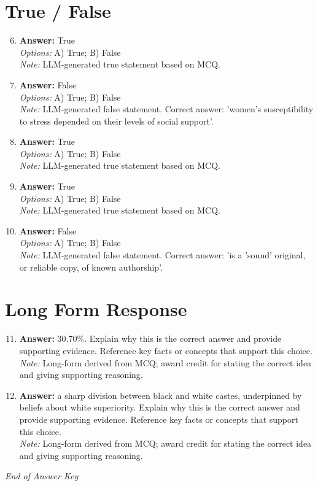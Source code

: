 \documentclass[12pt]{article}
\begin{document}
\section*{True / False}
\begin{enumerate}[label=\arabic*.]
\setcounter{enumi}{5}
\item \textbf{Answer:} True
\\ \textit{Options:} A) True; B) False
\\ \textit{Note:} LLM-generated true statement based on MCQ.
\item \textbf{Answer:} False
\\ \textit{Options:} A) True; B) False
\\ \textit{Note:} LLM-generated false statement. Correct answer: 'women's susceptibility to stress depended on their levels of social support'.
\item \textbf{Answer:} True
\\ \textit{Options:} A) True; B) False
\\ \textit{Note:} LLM-generated true statement based on MCQ.
\item \textbf{Answer:} True
\\ \textit{Options:} A) True; B) False
\\ \textit{Note:} LLM-generated true statement based on MCQ.
\item \textbf{Answer:} False
\\ \textit{Options:} A) True; B) False
\\ \textit{Note:} LLM-generated false statement. Correct answer: 'is a 'sound' original, or reliable copy, of known authorship'.
\end{enumerate}

\section*{Long Form Response}
\begin{enumerate}[label=\arabic*.]
\setcounter{enumi}{10}
\item \textbf{Answer:} 30.70\%. Explain why this is the correct answer and provide supporting evidence. Reference key facts or concepts that support this choice.
\\ \textit{Note:} Long-form derived from MCQ; award credit for stating the correct idea and giving supporting reasoning.
\item \textbf{Answer:} a sharp division between black and white castes, underpinned by beliefs about white superiority. Explain why this is the correct answer and provide supporting evidence. Reference key facts or concepts that support this choice.
\\ \textit{Note:} Long-form derived from MCQ; award credit for stating the correct idea and giving supporting reasoning.
\end{enumerate}

\vfill
\noindent\textit{End of Answer Key}
\end{document}
